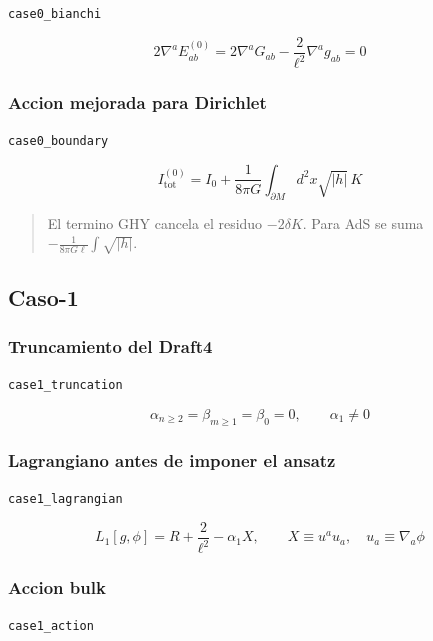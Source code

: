 \documentclass[11pt,a4paper]{article}
\begin{document}
\noindent\texttt{case0\_bianchi}\par\nopagebreak[4]

\[
2\nabla^aE^{(0)}_{ab} = 2\nabla^aG_{ab}-\frac{2}{\ell^2}\nabla^ag_{ab}=0
\]

\subsubsection{Accion mejorada para Dirichlet}

\noindent\texttt{case0\_boundary}\par\nopagebreak[4]

\[
I^{(0)}_{\mathrm{tot}} = I_0+\frac{1}{8\pi G}\int_{\partial M}d^2x\sqrt{|h|}\,K
\]

\begin{quote}\small El termino GHY cancela el residuo \(-2\delta K\). Para AdS se suma \(-\frac{1}{8\pi G\ell}\int\sqrt{|h|}\).\end{quote}

\subsection{Caso-1}

\subsubsection{Truncamiento del Draft4}

\noindent\texttt{case1\_truncation}\par\nopagebreak[4]

\[
\alpha_{n\ge2}=\beta_{m\ge1}=\beta_0 = 0,\qquad \alpha_1\ne0
\]

\subsubsection{Lagrangiano antes de imponer el ansatz}

\noindent\texttt{case1\_lagrangian}\par\nopagebreak[4]

\[
L_1[g,\phi] = R+\frac{2}{\ell^2}-\alpha_1X,\qquad X\equiv u^au_a,\quad u_a\equiv\nabla_a\phi
\]

\subsubsection{Accion bulk}

\noindent\texttt{case1\_action}\par\nopagebreak[4]
\end{document}
